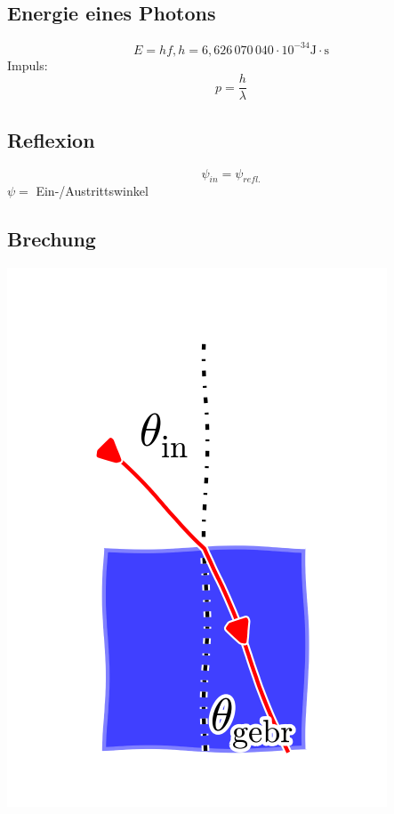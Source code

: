 \documentclass{article}
\begin{document}
\begin{multicols*}{3}
  \subsection{Energie eines Photons}
  $$E = hf, h = 6{,}626\,070\,040 \cdot 10^{-34} \mathrm{J \cdot s}$$
  Impuls:
  $$p=\frac{h}{\lambda}$$

  \subsection{Reflexion}
  $$\psi _{in} = \psi_{refl.}$$
  $\psi =$ Ein-/Austrittswinkel
  \subsection{Brechung}
  \includegraphics[scale=0.15, angle=90]{brechung}

\end{multicols*}
\end{document}
